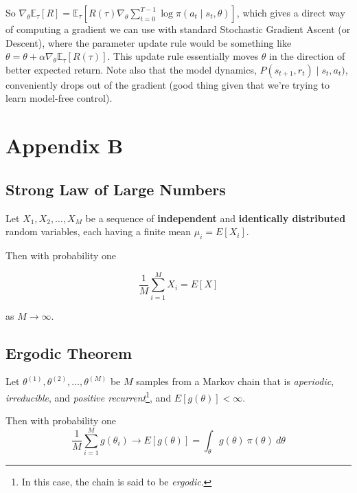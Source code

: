 \documentclass[11pt, oneside]{article}					%
\begin{document}
\bigskip
{
\noindent
So $\nabla_{\theta} \mathbb{E}_{\tau} [R] = \mathbb{E}_{\tau}
[R(\tau) \nabla_{\theta} \sum\limits_{t = 0}^{T-1} \log{\pi(a_t
\mid s_t,\theta)}]$, which gives a direct way of computing a
gradient we can use with standard Stochastic Gradient Ascent (or
Descent), where the parameter update rule would be something like
$\theta = \theta + \alpha \nabla_{\theta} \mathbb{E}_{\tau}[R(\tau)]$. 
This update rule essentially moves $\theta$ in the direction of 
better expected return. Note also that the model dynamics, 
$P(s_{t+1},r_t) \mid s_t,a_t)$, conveniently drops out of the 
gradient (good thing given that we're trying to learn model-free 
control).
\par}

\section{Appendix B}
\label{appendix:b}

\subsection{Strong Law of Large Numbers}
\label{sec:slln}
Let $X_{1}, X_{2}, \hdots, X_{M}$ be a sequence of 
\textbf{independent} and \textbf{identically distributed} 
random variables, each having a finite mean $\mu_i = E[X_{i}]$. 

\bigskip
\noindent
Then with probability one

\bigskip
\begin{equation*}
\frac{1}{M}\sum\limits_{i=1}^{M} X_i = E[X]
\end{equation*}

\bigskip
\noindent
as  $M \rightarrow \infty$.

\subsection{Ergodic Theorem}
\label{sec:ergodic}
Let $\theta^{(1)}, \theta^{(2)}, \hdots, \theta^{(M)}$ be $M$
samples from a Markov chain that is \emph{aperiodic},
\emph{irreducible}, and \emph{positive recurrent}\footnote{In
this case, the chain is said to be \emph{ergodic}.}, and
$E[g(\theta)] < \infty$.

\bigskip
\noindent
Then with probability one
\bigskip
\begin{equation*}
\frac{1}{M}\sum\limits_{i = 1}^{M} g(\theta_{i}) \rightarrow
E[g(\theta)]  = \int_{\theta}^{}g(\theta) \: \pi(\theta)
\:d\theta 
\end{equation*}
\end{document}
